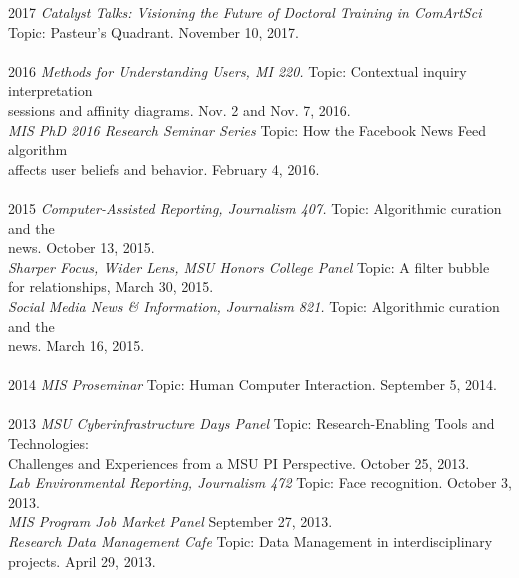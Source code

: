 \documentclass[9pt]{extarticle}
\begin{document}
\begin{tabbing}
2017 \hspace{0.3in}\=  \emph{Catalyst Talks: Visioning the Future of Doctoral Training in ComArtSci} \\ 
\> \hspace{0.5cm} Topic: Pasteur's Quadrant. November 10, 2017. \\\\

2016 \hspace{0.3in}\=  \emph{Methods for Understanding Users, MI 220.} Topic: Contextual inquiry interpretation \\
\> \hspace{0.5cm} sessions and affinity diagrams. Nov. 2 and Nov. 7, 2016. \\
\> \emph{MIS PhD 2016 Research Seminar Series} Topic: How the Facebook News Feed algorithm \\
\> \hspace{0.5cm} affects user beliefs and behavior. February 4, 2016.\\\\

2015 \hspace{0.3in}\=  \emph{Computer-Assisted Reporting, Journalism 407.} Topic: Algorithmic curation and the \\
\> \hspace{0.5cm} news. October 13, 2015. \\
\> \emph{Sharper Focus, Wider Lens, MSU Honors College Panel} Topic: A filter bubble \\
\> \hspace{0.5cm} for relationships, March 30, 2015.\\
\> \emph{Social Media News \& Information, Journalism 821.} Topic: Algorithmic curation and the \\
\> \hspace{0.5cm} news. March 16, 2015. \\\\

2014 \hspace{0.3in}\=  \emph{MIS Proseminar} Topic: Human Computer Interaction. September 5, 2014.\\\\

2013 \hspace{0.3in}\=  \emph{MSU Cyberinfrastructure Days Panel} Topic: Research-Enabling Tools and Technologies:\\
\> \hspace{0.5cm} Challenges and Experiences from a MSU PI Perspective. October 25, 2013.\\ 
\> \emph{Lab Environmental Reporting, Journalism 472} Topic: Face recognition. October 3, 2013. \\
\> \emph{MIS Program Job Market Panel} September 27, 2013. \\
\> \emph{Research Data Management Cafe} Topic: Data Management in interdisciplinary \\
\> \hspace{0.5cm} projects. April 29, 2013. \\\\ %


\end{tabbing}
\end{document}

